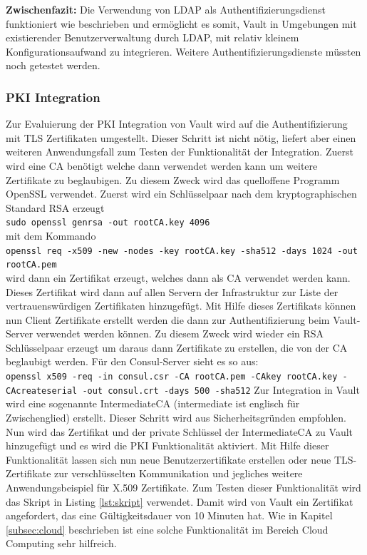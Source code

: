 \documentclass[
book,
a4paper,   
titlepage,  
halfparskip,
12pt        
]{scrartcl}
\newcommand\inline{\lstinline[basicstyle=\ttfamily]}
\begin{document}
\begin{onehalfspacing}
\textbf{Zwischenfazit:} Die Verwendung von LDAP als Authentifizierungsdienst funktioniert wie beschrieben und ermöglicht es somit, Vault in Umgebungen mit existierender Benutzerverwaltung durch LDAP, mit relativ kleinem Konfigurationsaufwand zu integrieren. Weitere Authentifizierungsdienste müssten noch getestet werden.

\subsubsection{\acs{PKI} Integration} 
Zur Evaluierung der \ac{PKI} Integration von Vault wird auf die Authentifizierung mit \ac{TLS} Zertifikaten umgestellt. Dieser Schritt ist nicht nötig, liefert aber einen weiteren Anwendungsfall zum Testen der Funktionalität der Integration. Zuerst wird eine \ac{CA} benötigt welche dann verwendet werden kann um weitere Zertifikate zu beglaubigen. Zu diesem Zweck wird das quelloffene Programm OpenSSL verwendet. Zuerst wird ein Schlüsselpaar nach dem kryptographischen Standard RSA erzeugt\\\inline|sudo openssl genrsa -out rootCA.key 4096|\\ mit dem Kommando\\\inline|openssl req -x509 -new -nodes -key rootCA.key -sha512 -days 1024 -out rootCA.pem|\\ wird dann ein Zertifikat erzeugt, welches dann als \ac{CA} verwendet werden kann. Dieses Zertifikat wird dann auf allen Servern der Infrastruktur zur Liste der vertrauenswürdigen Zertifikaten hinzugefügt. Mit Hilfe dieses Zertifikats können nun Client Zertifikate erstellt werden die dann zur Authentifizierung beim Vault-Server verwendet werden können. Zu diesem Zweck wird wieder ein RSA Schlüsselpaar erzeugt um daraus dann Zertifikate zu erstellen, die von der \ac{CA} beglaubigt werden. Für den Consul-Server sieht es so aus:\cite{openssl}\\\inline|openssl x509 -req -in consul.csr -CA rootCA.pem -CAkey rootCA.key -CAcreateserial -out consul.crt -days 500 -sha512|\newline
Zur Integration in Vault wird eine sogenannte Intermediate\ac{CA} (intermediate ist englisch für Zwischenglied) erstellt. Dieser Schritt wird aus Sicherheitsgründen empfohlen\cite{vaultpki}. Nun wird das Zertifikat und der private Schlüssel der Intermediate\ac{CA} zu Vault hinzugefügt und es wird die \ac{PKI} Funktionalität aktiviert. Mit Hilfe dieser Funktionalität lassen sich nun neue Benutzerzertifikate erstellen oder neue \ac{TLS}-Zertifikate zur verschlüsselten Kommunikation und jegliches weitere Anwendungsbeispiel für X.509 Zertifikate. Zum Testen dieser Funktionalität wird das Skript in Listing \vref{lst:skript} verwendet. Damit wird von Vault ein Zertifikat angefordert, das eine Gültigkeitsdauer von 10 Minuten hat. Wie in Kapitel \vref{subsec:cloud} beschrieben ist eine solche Funktionalität im Bereich Cloud Computing sehr hilfreich.


\end{onehalfspacing}
\end{document}
